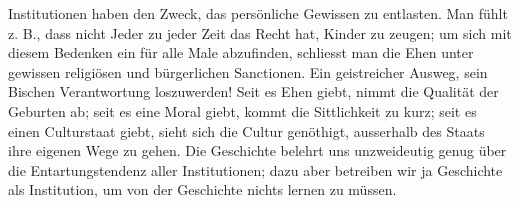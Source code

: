 Institutionen haben den Zweck, das persönliche Gewissen zu entlasten. Man fühlt z. B., dass nicht Jeder zu jeder Zeit das Recht hat, Kinder zu zeugen; um sich mit diesem Bedenken ein für alle Male abzufinden, schliesst man die Ehen unter gewissen religiösen und bürgerlichen Sanctionen. Ein geistreicher Ausweg, sein Bischen Verantwortung loszuwerden! Seit es Ehen giebt, nimmt die Qualität der Geburten ab; seit es eine Moral giebt, kommt die Sittlichkeit zu kurz; seit es einen Culturstaat giebt, sieht sich die Cultur genöthigt, ausserhalb des Staats ihre eigenen Wege zu gehen. Die Geschichte belehrt uns unzweideutig genug über die Entartungstendenz aller Institutionen; dazu aber betreiben wir ja Geschichte als Institution, um von der Geschichte nichts lernen zu müssen.
\par

